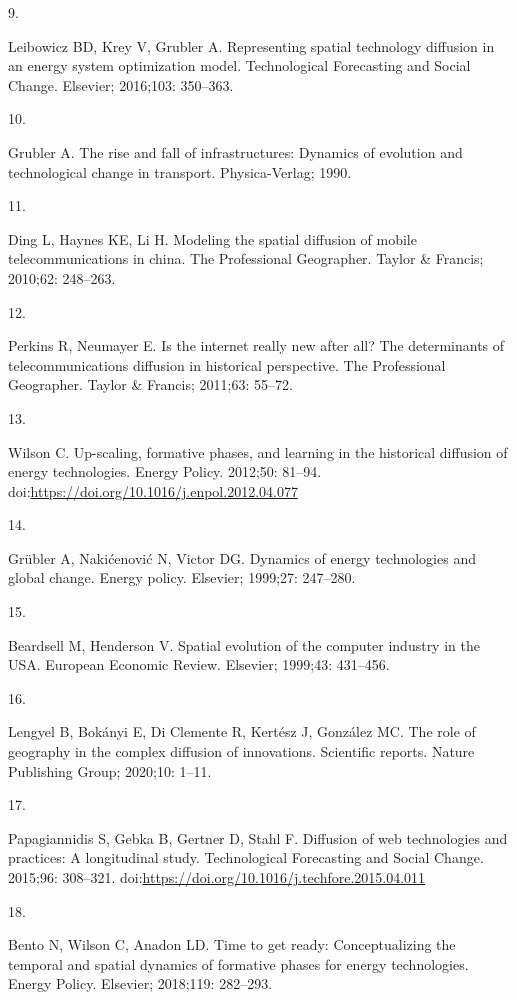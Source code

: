 \documentclass[10pt,letterpaper]{article}
\newlength{\cslhangindent}
\newlength{\csllabelwidth}
\newlength{\cslentryspacingunit} %
\newenvironment{CSLReferences}[2] %
 {%
  \setlength{\parindent}{0pt}
  \ifodd #1
  \let\oldpar\par
  \def\par{\hangindent=\cslhangindent\oldpar}
  \fi
  \setlength{\parskip}{#2\cslentryspacingunit}
 }%
 {}
\newcommand{\CSLLeftMargin}[1]{\parbox[t]{\csllabelwidth}{#1}}
\newcommand{\CSLRightInline}[1]{\parbox[t]{\linewidth - \csllabelwidth}{#1}\break}
\begin{document}
\begin{CSLReferences}{0}{0}
\leavevmode{}%
\CSLLeftMargin{9. }%
\CSLRightInline{Leibowicz BD, Krey V, Grubler A. Representing spatial
technology diffusion in an energy system optimization model.
Technological Forecasting and Social Change. Elsevier; 2016;103:
350--363. }

\leavevmode{}%
\CSLLeftMargin{10. }%
\CSLRightInline{Grubler A. The rise and fall of infrastructures:
Dynamics of evolution and technological change in transport.
Physica-Verlag; 1990. }

\leavevmode{}%
\CSLLeftMargin{11. }%
\CSLRightInline{Ding L, Haynes KE, Li H. Modeling the spatial diffusion
of mobile telecommunications in china. The Professional Geographer.
Taylor \& Francis; 2010;62: 248--263. }

\leavevmode{}%
\CSLLeftMargin{12. }%
\CSLRightInline{Perkins R, Neumayer E. Is the internet really new after
all? The determinants of telecommunications diffusion in historical
perspective. The Professional Geographer. Taylor \& Francis; 2011;63:
55--72. }

\leavevmode{}%
\CSLLeftMargin{13. }%
\CSLRightInline{Wilson C. Up-scaling, formative phases, and learning in
the historical diffusion of energy technologies. Energy Policy. 2012;50:
81--94. doi:\url{https://doi.org/10.1016/j.enpol.2012.04.077}}

\leavevmode{}%
\CSLLeftMargin{14. }%
\CSLRightInline{Grübler A, Nakićenović N, Victor DG. Dynamics of energy
technologies and global change. Energy policy. Elsevier; 1999;27:
247--280. }

\leavevmode{}%
\CSLLeftMargin{15. }%
\CSLRightInline{Beardsell M, Henderson V. Spatial evolution of the
computer industry in the USA. European Economic Review. Elsevier;
1999;43: 431--456. }

\leavevmode{}%
\CSLLeftMargin{16. }%
\CSLRightInline{Lengyel B, Bokányi E, Di Clemente R, Kertész J, González
MC. The role of geography in the complex diffusion of innovations.
Scientific reports. Nature Publishing Group; 2020;10: 1--11. }

\leavevmode{}%
\CSLLeftMargin{17. }%
\CSLRightInline{Papagiannidis S, Gebka B, Gertner D, Stahl F. Diffusion
of web technologies and practices: A longitudinal study. Technological
Forecasting and Social Change. 2015;96: 308--321.
doi:\url{https://doi.org/10.1016/j.techfore.2015.04.011}}

\leavevmode{}%
\CSLLeftMargin{18. }%
\CSLRightInline{Bento N, Wilson C, Anadon LD. Time to get ready:
Conceptualizing the temporal and spatial dynamics of formative phases
for energy technologies. Energy Policy. Elsevier; 2018;119: 282--293. }

\end{CSLReferences}

\nolinenumbers
\end{document}
